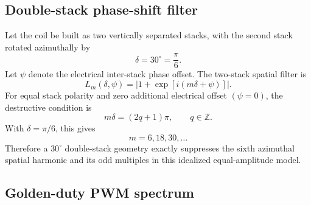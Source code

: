 \subsection{Double-stack phase-shift filter}

Let the coil be built as two vertically separated stacks, with the second stack rotated azimuthally by
\begin{equation}
\delta = 30^\circ = \frac{\pi}{6}.
\end{equation}
Let $\psi$ denote the electrical inter-stack phase offset. The two-stack spatial filter is
\begin{equation}
L_m(\delta,\psi)
=
\left|
1+\exp[i(m\delta+\psi)]
\right|.
\label{eq:appendix_stack_filter}
\end{equation}
For equal stack polarity and zero additional electrical offset $(\psi=0)$, the destructive condition is
\begin{equation}
m\delta=(2q+1)\pi,
\qquad q\in\mathbb{Z}.
\end{equation}
With $\delta=\pi/6$, this gives
\begin{equation}
\boxed{
m = 6,18,30,\ldots
}
\end{equation}
Therefore a $30^\circ$ double-stack geometry exactly suppresses the sixth azimuthal spatial harmonic and its odd multiples in this idealized equal-amplitude model.

\subsection{Golden-duty PWM spectrum}

